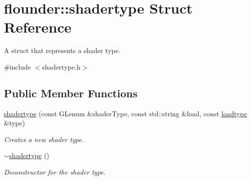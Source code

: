 \hypertarget{structflounder_1_1shadertype}{}\section{flounder\+:\+:shadertype Struct Reference}
\label{structflounder_1_1shadertype}


A struct that represents a shader type.  




{\ttfamily \#include $<$shadertype.\+h$>$}

\subsection*{Public Member Functions}
\begin{DoxyCompactItemize}
\item 
\hyperlink{structflounder_1_1shadertype_ab07bba0e24d93987008aba47fab39187}{shadertype} (const G\+Lenum \&shader\+Type, const std\+::string \&load, const \hyperlink{namespaceflounder_a69b4e6ffcd64f6175546ca0942d18565}{loadtype} \&type)
\begin{DoxyCompactList}\small\item\em Creates a new shader type. \end{DoxyCompactList}\item 
\hyperlink{structflounder_1_1shadertype_a1be8736128147f1f214b12f3d1901a23}{$\sim$shadertype} ()
\begin{DoxyCompactList}\small\item\em Deconstructor for the shader type. \end{DoxyCompactList}\end{DoxyCompactItemize}

